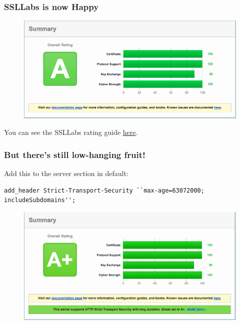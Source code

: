 \documentclass[9pt]{beamer}
\begin{document}
\begin{frame}[fragile]
\frametitle{SSLLabs is now Happy}
\begin{figure}
\includegraphics[scale=0.25]{figures/SSLLabsA.png}
\end{figure}
You can see the SSLLabs rating guide \href{https://www.ssllabs.com/downloads/SSL_Server_Rating_Guide.pdf}{here}.
\end{frame}

\begin{frame}[fragile]
\frametitle{But there's still low-hanging fruit!}
Add this to the server section in default:
\begin{verbatim}
add_header Strict-Transport-Security ``max-age=63072000; includeSubdomains'';
\end{verbatim}
\begin{figure}
\includegraphics[scale=0.25]{figures/SSLLabsAp.png}
\end{figure}
\end{frame}
\end{document}
